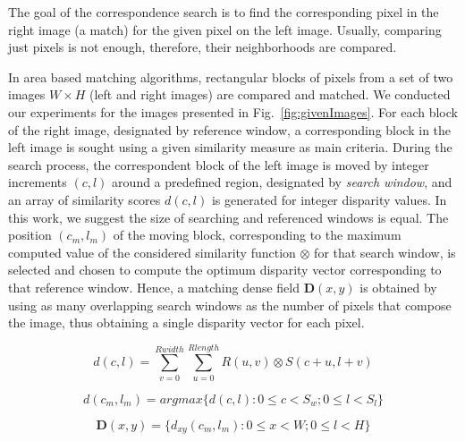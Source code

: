 \documentclass[conference]{IEEEtran}
\begin{document}
The goal of the correspondence search is to find the corresponding pixel in the right image (a match) for the given pixel on the left image. Usually, comparing just pixels is not enough, therefore, their neighborhoods are compared.

In area based matching algorithms, rectangular blocks of pixels from a set of two images $W \times H$ (left and right images) are compared and matched. We conducted our experiments for the images presented in Fig.~\ref{fig:givenImages}.  For each block of the right image, designated by reference window, a corresponding block in the left image is sought using a given similarity measure as main criteria. During the search process, the correspondent block of the left image is moved by integer increments $(c,l)$ around a predefined region, designated by \textit{search window}, and an array of similarity scores $d(c,l)$ is generated for integer disparity values. In this work, we suggest the size of searching and referenced windows is equal. The position $(c_m, l_m)$ of the moving block, corresponding to the maximum computed value of the considered similarity function $\otimes$ for that search window, is selected and chosen to compute the optimum disparity vector corresponding to that reference window. Hence, a matching dense field $\mathbf{D}(x,y)$ is obtained by using as many overlapping search windows as the number of pixels that compose the image, thus obtaining a single disparity vector for each pixel.




\begin{equation}
d(c,l) = \sum_{v=0}^{Rwidth}\sum_{u=0}^{Rlength}R\left(u,v\right)\otimes S\left(c+u,l+v\right)
\end{equation}

\begin{equation}
d(c_m,l_m) = argmax\{d(c,l): 0\leq c < S_w; 0\leq l < S_l \}
\end{equation}

\begin{equation}
\mathbf{D}(x,y) = \{ d_{xy}(c_m,l_m): 0\leq x < W; 0\leq l < H \}
\end{equation}
\end{document}
